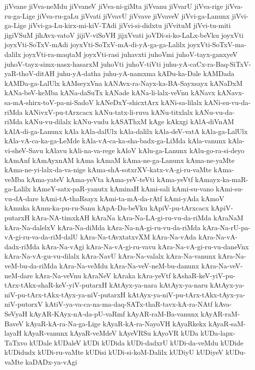 {jiVvane
jiVva-neMdu
jiVvaneV
jiVva-ni-giMta
jiVvanu
jiVvarU
jiVva-rige
jiVva-ru-ga-Lige
jiVva-ru-gaLu
jiVvati
jiVvavU
jiVvave
jiVvaveV
jiVvi-ga-Lanunx
jiVvi-ga-Lige
jiVvi-ga-Lu-kirx-mi-kiV-TAdi
jiVvi-si-didxtu
jiVvituM
jiVvi-tu-miti
jigiVSuM
jihAvx-vatoV
jijiV-viSoVH
jijxVvati
joVDi-si-ko-LaLx-beVku
joyxVti
joyxVti-SoTxV-mAdi
joyxVti-SoTxV-mA-di-yA-ga-ga-Lalilx
joyxVti-SoTxV-ma-dalilx
joyxVti-ra-maqtaM
joyxVti-rasi
juhavxti
juhoVmi
juhoV-tayx-ganxyeV
juhoV-tayx-simx-nasx-hasarxM
juhoVti
juhoV-tiVti
juhu-yA-caCx-ra-Baq-SiTxV-yaR-thoV-ditAH
juhu-yA-datha
juhu-yA-namxma
kADu-ka-Dale
kAMDada
kAMDa-ga-LalUlx
kAMseyxVna
kANAvx-ra-Nayx-ka-BA-Sayxsayx
kANaDxM
kANa-beV-keMba
kANa-daSuTx
kANade
kANa-li-lalx-veVnu
kANavx
kANavx-sa-mA-shirx-toV-pa-ni-SadoV
kANeDxY-shicxtArx
kANi-sa-lilalx
kANi-su-vu-da-riMda
kANivxV-pu-tArxcacx
kANu-tatx-li-ruva
kANu-titxlalx
kANu-vu-da-riMda
kANu-vu-dilalx
kANu-vudu
kASAThxM
kAge
kAkxgi
kAlA-diVnAM
kAlA-di-ga-Lanunx
kAla
kAla-dalUlx
kAla-dalilx
kAla-deV-vatA
kAla-ga-LalUlx
kAla-vA-ca-ka-ga-LeMde
kAla-vA-ca-ka-sha-badx-ga-LiMda
kAla-vanunx
kAla-vi-sheV-Savu
kAlavu
kAli-na-va-rege
kAloV
kAlu-ga-Lanunx
kAlu-go-ra-si-deyo
kAmAnf
kAmAyxnAM
kAma
kAmaM
kAma-ne-ga-Lanunx
kAma-ne-yaMte
kAma-ne-yi-lalx-da-va-nige
kAma-shA-sotxrXV-katx-vA-gi-ru-vaMte
kAma-veMba
kAma-yateV
kAma-yeVta
kAma-yeV-teVti
kAma-yeVtf
kAmayx-ka-maR-ga-Lalilx
kAmeY-satx-paR-yanutx
kAminaH
kAmi-sali
kAmi-su-vano
kAmi-su-vu-dA-dare
kAmi-tA-thaRsayx
kAmi-ta-mA-da-rAtf
kAmi-yAda
kAmoV
kAmuka
kAmu-ka-pu-ru-Sanu
kApA-Da-beVku
kApiV-pu-tArxcacx
kApiV-putarxH
kAra-NA-timxkAH
kAraNa
kAra-Na-LA-gi-ru-vu-da-riMda
kAraNaM
kAra-Na-dalelxV
kAra-Na-diMda
kAra-Na-nA-gi-ru-vu-da-riMda
kAra-Na-rU-pa-vA-gi-ru-va-da-riM-dalU
kAra-Na-tAvxtatxvXM
kAra-Na-vAda
kAra-Na-vA-dadx-riMda
kAra-Na-vAgi
kAra-Na-vA-gi-ru-vavu
kAra-Na-vA-gi-ru-vu-daneVnx
kAra-Na-vA-gu-vu-dilalx
kAra-NavU
kAra-Na-valalx
kAra-Na-vanunx
kAra-Na-veM-bu-da-riMda
kAra-Na-veMdu
kAra-Na-veV-neM-bu-danunx
kAra-Na-veV-neM-dare
kAra-Na-veVnu
kAraNeV
kAraka
kAra-yeVtf
kAshaR-keV-yiV-pu-tArx-tAkx-shaR-keV-yiV-putarxH
kAtAyx-ya-nara
kAtAyx-ya-naru
kAtAyx-ya-niV-pu-tArx-tAkx-tAyx-ya-niV-putarxH
kAtAyx-ya-niV-pu-tArx-tAkx-tAyx-ya-niV-putorxV
kAtiV-ya-va-ca-na-ma-daq-SATx-thaR-tavx-kA-ra-NAtf
kAva-SeVyaH
kAyAR-KAyx-nA-da-pU-vaRmf
kAyAR-raM-Ba-vanunx
kAyAR-raM-BaveV
kAyaR-kA-ra-Na-ga-Lige
kAyaR-kA-ra-NayoVH
kAyaRkekx
kAyaR-saM-layaH
kAyaR-vanunx
kAyaR-veMdeV
kAyeVRSu
kAyoVR
kUDa
kUDa-lapx-TaTxvo
kUDale
kUDaleV
kUDi
kUDida
kUDi-dadxrU
kUDi-da-veMdu
kUDide
kUDidudx
kUDi-ru-vaMte
kUDisi
kUDi-si-koM-Dalilx
kUDiyU
kUDiyeV
kUDu-vaMte
kaDADx-ya-vAgi
}
